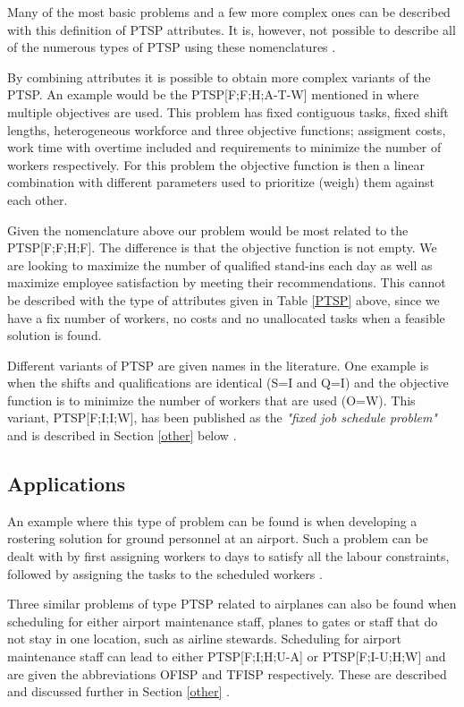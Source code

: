 Many of the most basic problems and a few more complex ones can be described with this definition of PTSP attributes. It is, however, not possible to describe all of the numerous types of PTSP using these nomenclatures \cite{krishnamoorthy_2001}.

By combining attributes it is possible to obtain more complex variants of the PTSP. An example would be the PTSP[F;F;H;A-T-W] mentioned in \cite{krishnamoorthy_2001} where multiple objectives are used. This problem has fixed contiguous tasks, fixed shift lengths, heterogeneous workforce and three objective functions; assigment costs, work time with overtime included and requirements to minimize the number of workers respectively. For this problem the objective function is then a linear combination with different parameters used to prioritize (weigh) them against each other.

Given the nomenclature above our problem would be most related to the PTSP[F;F;H;F]. The difference is that the objective function is not empty. We are looking to maximize the number of qualified stand-ins each day as well as maximize employee satisfaction by meeting their recommendations. This cannot be described with the type of attributes given in Table \ref{PTSP} above, since we have a fix number of workers, no costs and no unallocated tasks when a feasible solution is found. 

Different variants of PTSP are given names in the literature. One example is when the shifts and qualifications are identical (S=I and Q=I) and the objective function is to minimize the number of workers that are used (O=W). This variant, PTSP[F;I;I;W], has been published as the \textit{"fixed job schedule problem"} and is described in Section \ref{other} below \cite{krishnamoorthy_2001}.

\subsection{Applications}
An example where this type of problem can be found is when developing a rostering solution for ground personnel at an airport. Such a problem can be dealt with by first assigning workers to days to satisfy all the labour constraints, followed by assigning the tasks to the scheduled workers \cite{krishnamoorthy_2001}.

Three similar problems of type PTSP related to airplanes can also be found when scheduling for either airport maintenance staff, planes to gates or staff that do not stay in one location, such as airline stewards. Scheduling for airport maintenance staff can lead to either PTSP[F;I;H;U-A] or PTSP[F;I-U;H;W] and are given the abbreviations OFISP and TFISP respectively. These are described and discussed further in Section \ref{other} \cite{krishnamoorthy_2001}. 

